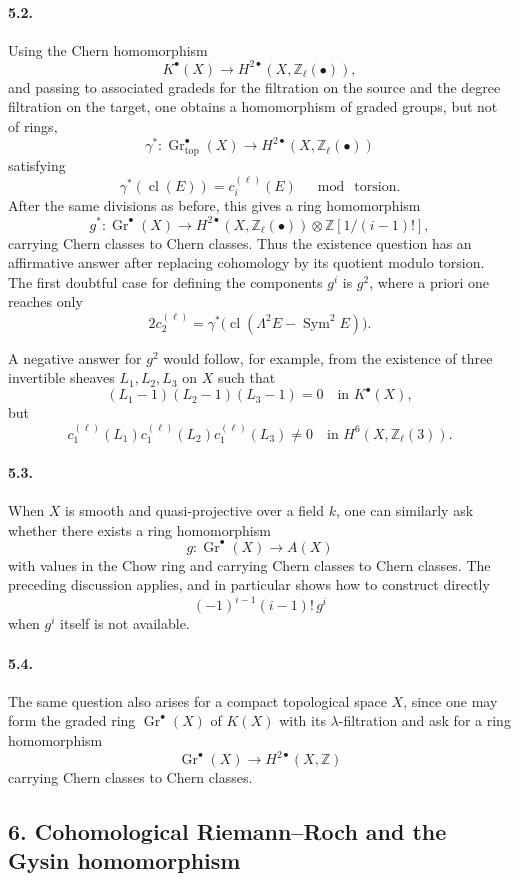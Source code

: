 \documentclass[11pt]{article}
\theoremstyle{plain}
\theoremstyle{definition}
\theoremstyle{remark}
\newcommand{\ZZ}{\mathbb Z}
\DeclareMathOperator{\Gr}{Gr}
\DeclareMathOperator{\cl}{cl}
\newcommand{\longto}{\longrightarrow}
\providecommand{\Sym}{\operatorname{Sym}}
\providecommand{\topf}{\mathrm{top}}
\begin{document}
\paragraph{5.2.}
Using the Chern homomorphism
\[
K^\bullet(X)\longto H^{2\bullet}(X,\ZZ_\ell(\bullet)),
\]
and passing to associated gradeds for the filtration on the source and the degree filtration on the target, one obtains a homomorphism of graded groups, but not of rings,
\[
\gamma^*:\Gr^\bullet_{\topf}(X)\longto H^{2\bullet}(X,\ZZ_\ell(\bullet))
\]
satisfying
\[
\gamma^*(\cl(E))=c_i^{(\ell)}(E)\quad\bmod\ \text{torsion}.
\]
After the same divisions as before, this gives a ring homomorphism
\[
g^*:\Gr^\bullet(X)\longto
H^{2\bullet}(X,\ZZ_\ell(\bullet))\otimes \ZZ[1/(i-1)!],
\]
carrying Chern classes to Chern classes. Thus the existence question has an affirmative answer after replacing cohomology by its quotient modulo torsion. The first doubtful case for defining the components $g^i$ is $g^2$, where a priori one reaches only
\[
2c_2^{(\ell)}=\gamma^*\bigl(\cl(\Lambda^2E-\Sym^2E)\bigr).
\]

A negative answer for $g^2$ would follow, for example, from the existence of three invertible sheaves $L_1,L_2,L_3$ on $X$ such that
\[
(L_1-1)(L_2-1)(L_3-1)=0\quad\text{in }K^\bullet(X),
\]
but
\[
c_1^{(\ell)}(L_1)c_1^{(\ell)}(L_2)c_1^{(\ell)}(L_3)\neq0
\quad\text{in }H^6(X,\ZZ_\ell(3)).
\]

\paragraph{5.3.}
When $X$ is smooth and quasi-projective over a field $k$, one can similarly ask whether there exists a ring homomorphism
\[
g:\Gr^\bullet(X)\longto A(X)
\]
with values in the Chow ring and carrying Chern classes to Chern classes. The preceding discussion applies, and in particular shows how to construct directly
\[
(-1)^{i-1}(i-1)!\,g^i
\]
when $g^i$ itself is not available.

\paragraph{5.4.}
The same question also arises for a compact topological space $X$, since one may form the graded ring $\Gr^\bullet(X)$ of $K(X)$ with its $\lambda$-filtration and ask for a ring homomorphism
\[
\Gr^\bullet(X)\longto H^{2\bullet}(X,\ZZ)
\]
carrying Chern classes to Chern classes.

\subsection*{6. Cohomological Riemann--Roch and the Gysin homomorphism}
\end{document}
